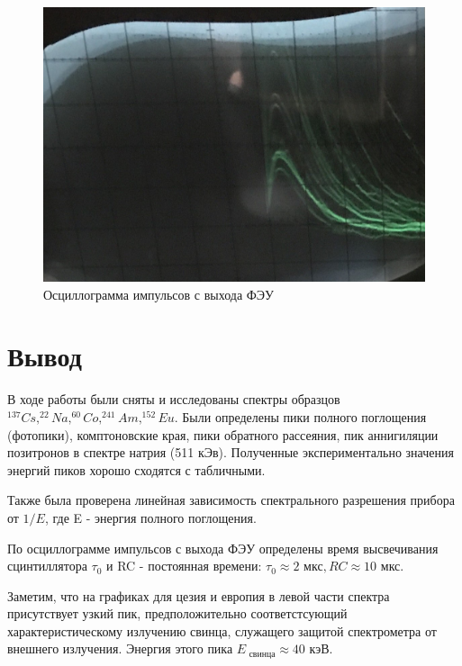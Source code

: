 \documentclass[a4paper,12pt]{article} %
\begin{document}
\begin{figure}[h!]
    \centering
    \includegraphics[scale=0.2]{фэу.jpg}
    \caption{Осциллограмма импульсов с выхода ФЭУ}
    
\end{figure}

\section{Вывод}

\noindent В ходе работы были сняты и исследованы спектры образцов $^{137}Cs,  ^{22}Na,  ^{60}Co,  ^{241}Am,  ^{152}Eu$. Были определены пики полного поглощения (фотопики), комптоновские края, пики обратного рассеяния, пик аннигиляции позитронов в спектре натрия (511 кЭв). Полученные экспериментально значения энергий пиков хорошо сходятся с табличными.

\medskip

\noindent Также была проверена линейная зависимость спектрального разрешения прибора от $1/E$, где E - энергия полного поглощения.

\medskip

\noindent По осциллограмме импульсов с выхода ФЭУ определены время высвечивания сцинтиллятора $\tau_0$ и RC - постоянная времени: $ \tau_0 \approx 2 \text{ мкс}, RC \approx 10 \text{ мкс}.$ 

\medskip

\noindent Заметим, что на графиках для цезия и европия в левой части спектра присутствует узкий пик, предположительно соответстсующий характеристическому излучению свинца, служащего защитой спектрометра от внешнего излучения. Энергия этого пика $E_{\text{ свинца}} \approx 40 \text{ кэВ} $.
\end{document}
